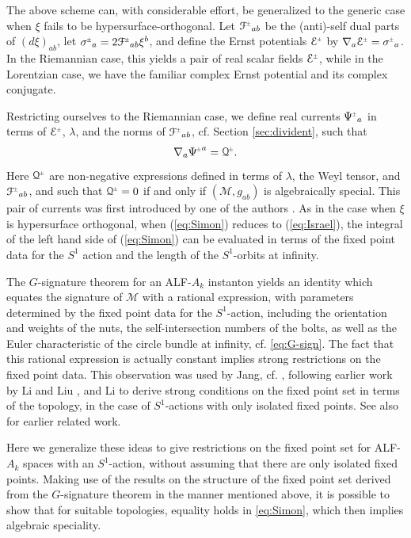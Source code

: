 \documentclass[a4paper,10pt,reqno]{amsart}
\newcommand{\cM}{\mathcal{M}}
\theoremstyle{plain}
\newcommand{\PM}[1]{{{#1}^{\hspace{-.5pt}\scaleto{\pm}{3.5pt}}}}
\def\Fcal{\mathcal{F}}
\def\Ecal{\mathcal{E}}
\def\Qcal{\mathcal{Q}}
\numberwithin{equation}{section}
\begin{document}
The above scheme can, with considerable effort, be generalized to the generic case when $\xi$ fails to be hypersurface-orthogonal. Let $\PM{\Fcal}_{ab}$ be the (anti)-self dual parts of $(d\xi)_{ab}$, let $\PM{\sigma}_{a}= 2 \PM{\Fcal}_{ab} \xi^{b}$, and define the Ernst potentials $\PM{\Ecal}$ by $\nabla_a \PM{\Ecal} = \PM{\sigma}_a$. In the Riemannian case, this yields a pair of real scalar fields $\PM{\Ecal}$, while in the Lorentzian case, we have the familiar complex Ernst potential and its complex conjugate.  

Restricting ourselves to the  Riemannian case, we define real currents $\PM{\Psi}_a$ in terms of $\PM{\Ecal}$, $\lambda$, and the norms of $\PM{\Fcal}_{ab}$, cf. Section \ref{sec:divident}, such that  
\begin{align} \label{eq:Simon} 
\nabla_a \PM{\Psi}^a = \PM{\Qcal}. 
\end{align} 
Here $\PM{\Qcal}$ are non-negative expressions defined in terms of $\lambda$, the Weyl tensor, and $\PM{\Fcal}_{ab}$, and such that $\PM{\Qcal} = 0$ if and only if $(\cM, g_{ab})$ is algebraically special. This pair of currents  was first introduced by one of the authors \cite{simon:1995}.  
As in the case when $\xi$ is hypersurface orthogonal, when (\ref{eq:Simon}) reduces to (\ref{eq:Israel}),  the integral of the left hand side of  (\ref{eq:Simon}) can be evaluated in terms of the fixed point data for the $S^1$ action and the length of the $S^1$-orbits at infinity. 


The $G$-signature theorem for an ALF-$A_k$ instanton yields an identity which equates the signature of $\cM$ with a rational expression, with parameters determined by the fixed point data for the $S^1$-action, including the orientation and weights of the nuts, the self-intersection numbers of the bolts, as well as the Euler characteristic of the circle bundle at infinity, cf. \eqref{eq:G-sign}. The fact that this rational expression is actually constant implies strong restrictions on the fixed point data. This observation was used by Jang, cf.  \cite{2018JGP...133..181J}, following earlier work by Li and Liu \cite{2010arXiv1012.1507L}, and Li \cite{MR3343967} to derive strong conditions on the fixed point set in terms of the topology, in the case of $S^1$-actions with only isolated fixed points. See also \cite{MR1201437} for earlier related work. 

Here we generalize these ideas to give restrictions on the fixed point set for ALF-$A_k$ spaces with an $S^1$-action, without assuming that there are only isolated fixed points.  Making use of the results on the structure of the fixed point set derived from the $G$-signature theorem in the manner mentioned above, it is possible to show that for suitable topologies, equality holds in \eqref{eq:Simon}, which then implies algebraic speciality. 
\end{document}

